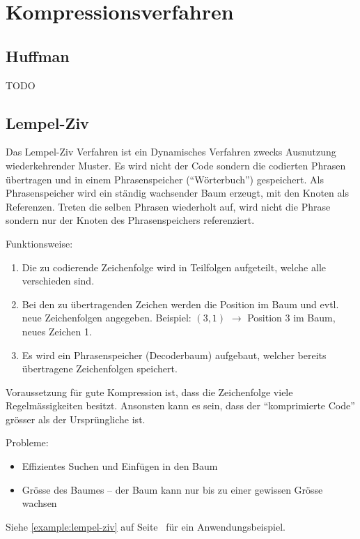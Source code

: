 \section{Kompressionsverfahren}

\subsection{Huffman}

TODO

\subsection{Lempel-Ziv}

Das Lempel-Ziv Verfahren ist ein Dynamisches Verfahren zwecks Ausnutzung
wiederkehrender Muster. Es wird nicht der Code sondern die codierten Phrasen
übertragen und in einem Phrasenspeicher (``Wörterbuch'') gespeichert. Als
Phrasenspeicher wird ein ständig wachsender Baum erzeugt, mit den Knoten als
Referenzen. Treten die selben Phrasen wiederholt auf, wird nicht die Phrase
sondern nur der Knoten des Phrasenspeichers referenziert.

Funktionsweise:

\begin{enumerate}
	\item Die zu codierende Zeichenfolge wird in Teilfolgen aufgeteilt, welche
		alle verschieden sind.
	\item Bei den zu übertragenden Zeichen werden die Position im Baum und evtl.
		neue Zeichenfolgen angegeben. Beispiel: $(3,1)$ $\rightarrow$ Position 3 im
		Baum, neues Zeichen 1.
	\item Es wird ein Phrasenspeicher (Decoderbaum) aufgebaut, welcher bereits
		übertragene Zeichenfolgen speichert.
\end{enumerate}

Voraussetzung für gute Kompression ist, dass die Zeichenfolge viele
Regelmässigkeiten besitzt. Ansonsten kann es sein, dass der ``komprimierte
Code'' grösser als der Ursprüngliche ist.

Probleme:
\begin{itemize}
	\item Effizientes Suchen und Einfügen in den Baum
	\item Grösse des Baumes -- der Baum kann nur bis zu einer gewissen Grösse wachsen
\end{itemize}

Siehe \autoref{example:lempel-ziv} auf Seite~\pageref{example:lempel-ziv}
für ein Anwendungsbeispiel.
